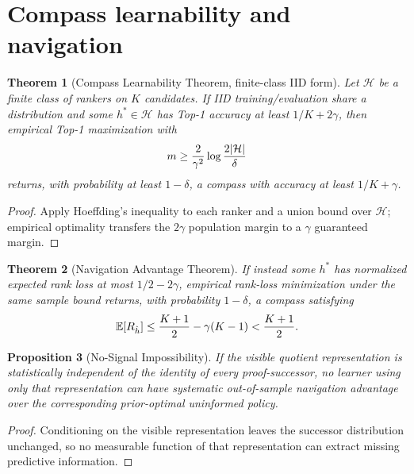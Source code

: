\documentclass[11pt]{article}
\newtheorem{theorem}{Theorem}[section]\newtheorem{corollary}[theorem]{Corollary}\newtheorem{proposition}[theorem]{Proposition}\newtheorem{conjecture}[theorem]{Conjecture}\newtheorem{definition}[theorem]{Definition}\newtheorem{remark}[theorem]{Remark}
\newcommand{\E}{\mathbb E}\newcommand{\Prob}{\mathbb P}\newcommand{\Qcal}{\mathcal Q}\newcommand{\Hcal}{\mathcal H}
\begin{document}
\section{Compass learnability and navigation}
\begin{theorem}[Compass Learnability Theorem, finite-class IID form]Let $\Hcal$ be a finite class of rankers on $K$ candidates. If IID training/evaluation share a distribution and some $h^*\in\Hcal$ has Top-1 accuracy at least $1/K+2\gamma$, then empirical Top-1 maximization with \[m\ge {2\over\gamma^2}\log{2|\Hcal|\over\delta}\] returns, with probability at least $1-\delta$, a compass with accuracy at least $1/K+\gamma$.\end{theorem}
\begin{proof}Apply Hoeffding's inequality to each ranker and a union bound over $\Hcal$; empirical optimality transfers the $2\gamma$ population margin to a $\gamma$ guaranteed margin.\end{proof}
\begin{theorem}[Navigation Advantage Theorem]If instead some $h^*$ has normalized expected rank loss at most $1/2-2\gamma$, empirical rank-loss minimization under the same sample bound returns, with probability $1-\delta$, a compass satisfying \[\E[R_{\hat h}]\le {K+1\over2}-\gamma(K-1)< {K+1\over2}.\]\end{theorem}
\begin{proposition}[No-Signal Impossibility]If the visible quotient representation is statistically independent of the identity of every proof-successor, no learner using only that representation can have systematic out-of-sample navigation advantage over the corresponding prior-optimal uninformed policy.\end{proposition}
\begin{proof}Conditioning on the visible representation leaves the successor distribution unchanged, so no measurable function of that representation can extract missing predictive information.\end{proof}
\end{document}
